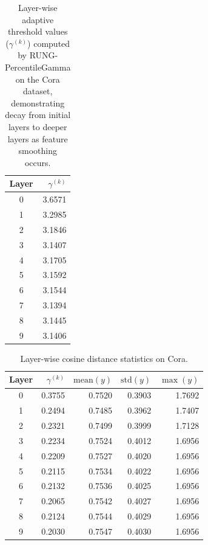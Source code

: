 \documentclass[sigconf]{acmart}
\begin{document}
\begin{table}[!ht]
  \centering
  \small
  \caption{Layer-wise adaptive threshold values ($\gamma^{(k)}$) computed by RUNG-PercentileGamma on the Cora dataset, demonstrating decay from initial layers to deeper layers as feature smoothing occurs.}
  \label{tab:percentile-gamma}
  \begin{tabular}{cr}
    \toprule
    Layer & $\gamma^{(k)}$ \\
    \midrule
    0 & 3.6571 \\
    1 & 3.2985 \\
    2 & 3.1846 \\
    3 & 3.1407 \\
    4 & 3.1705 \\
    5 & 3.1592 \\
    6 & 3.1544 \\
    7 & 3.1394 \\
    8 & 3.1445 \\
    9 & 3.1406 \\
    \bottomrule
  \end{tabular}
\end{table}

\begin{table}[!ht]
  \centering
  \footnotesize
  \caption{Layer-wise cosine distance statistics on Cora.}
  \label{tab:cosine-stats}
  \begin{tabular}{crrrr}
    \toprule
    Layer & $\gamma^{(k)}$ & $\mathrm{mean}(y)$ & $\mathrm{std}(y)$ & $\max(y)$ \\
    \midrule
    0 & 0.3755 & 0.7520 & 0.3903 & 1.7692 \\
    1 & 0.2494 & 0.7485 & 0.3962 & 1.7407 \\
    2 & 0.2321 & 0.7499 & 0.3999 & 1.7128 \\
    3 & 0.2234 & 0.7524 & 0.4012 & 1.6956 \\
    4 & 0.2209 & 0.7527 & 0.4020 & 1.6956 \\
    5 & 0.2115 & 0.7534 & 0.4022 & 1.6956 \\
    6 & 0.2132 & 0.7536 & 0.4025 & 1.6956 \\
    7 & 0.2065 & 0.7542 & 0.4027 & 1.6956 \\
    8 & 0.2124 & 0.7544 & 0.4029 & 1.6956 \\
    9 & 0.2030 & 0.7547 & 0.4030 & 1.6956 \\
    \bottomrule
  \end{tabular}
\end{table}
\end{document}
